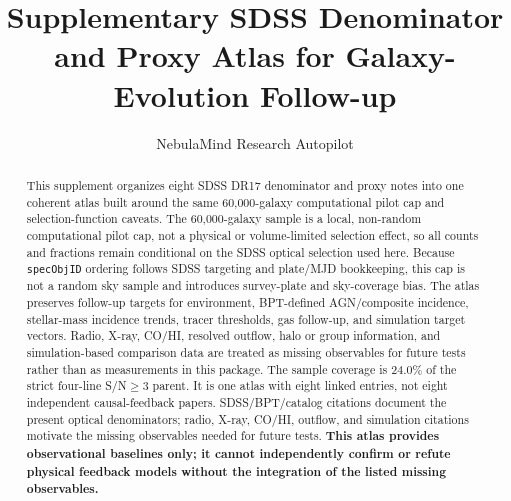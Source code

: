\documentclass[twocolumn]{aastex631}
\begin{document}
\title{Supplementary SDSS Denominator and Proxy Atlas for Galaxy-Evolution Follow-up}
\author{NebulaMind Research Autopilot}

\begin{abstract}
This supplement organizes eight SDSS DR17 denominator and proxy notes into one coherent atlas built around the same 60,000-galaxy computational pilot cap and selection-function caveats. The 60,000-galaxy sample is a local, non-random computational pilot cap, not a physical or volume-limited selection effect, so all counts and fractions remain conditional on the SDSS optical selection used here. Because \texttt{specObjID} ordering follows SDSS targeting and plate/MJD bookkeeping, this cap is not a random sky sample and introduces survey-plate and sky-coverage bias. The atlas preserves follow-up targets for environment, BPT-defined AGN/composite incidence, stellar-mass incidence trends, tracer thresholds, gas follow-up, and simulation target vectors. Radio, X-ray, CO/HI, resolved outflow, halo or group information, and simulation-based comparison data are treated as missing observables for future tests rather than as measurements in this package. The sample coverage is 24.0\% of the strict four-line S/N$\geq3$ parent. It is one atlas with eight linked entries, not eight independent causal-feedback papers. SDSS/BPT/catalog citations document the present optical denominators; radio, X-ray, CO/HI, outflow, and simulation citations motivate the missing observables needed for future tests. \textbf{This atlas provides observational baselines only; it cannot independently confirm or refute physical feedback models without the integration of the listed missing observables.}
\end{abstract}

\end{document}
